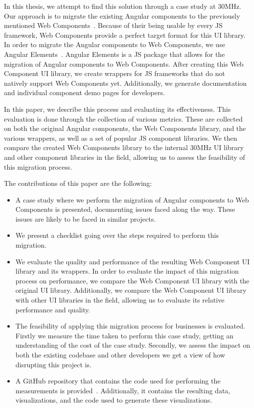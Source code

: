 In this thesis, we attempt to find this solution through a case study at 30MHz. Our approach is to migrate the existing Angular components to the previously mentioned Web Components~. Because of their being usable by every JS framework, Web Components provide a perfect target format for this UI library. In order to migrate the Angular components to Web Components, we use Angular Elements~. Angular Elements is a JS package that allows for the migration of Angular components to Web Components. After creating this Web Component UI library, we create wrappers for JS frameworks that do not natively support Web Components yet. Additionally, we generate documentation and individual component demo pages for developers.

In this paper, we describe this process and evaluating its effectiveness. This evaluation is done through the collection of various metrics. These are collected on both the original Angular components, the Web Components library, and the various wrappers, as well as a set of popular JS component libraries. We then compare the created Web Components library to the internal 30MHz UI library and other component libraries in the field, allowing us to assess the feasibility of this migration process.

The contributions of this paper are the following:

\begin{itemize}
	\item A case study where we perform the migration of Angular components to Web Components is presented, documenting issues faced along the way. These issues are likely to be faced in similar projects.
	\item We present a checklist going over the steps required to perform this migration.
	\item We evaluate the quality and performance of the resulting Web Component UI library and its wrappers. In order to evaluate the impact of this migration process on performance, we compare the Web Component UI library with the original UI library. Additionally, we compare the Web Component UI library with other UI libraries in the field, allowing us to evaluate its relative performance and quality.
	\item The feasibility of applying this migration process for businesses is evaluated. Firstly we measure the time taken to perform this case study, getting an understanding of the cost of the case study. Secondly, we assess the impact on both the existing codebase and other developers we get a view of how disrupting this project is.
	\item A GitHub repository that contains the code used for performing the measurements is provided~. Additionally, it contains the resulting data, visualizations, and the code used to generate these visualizations.
\end{itemize}